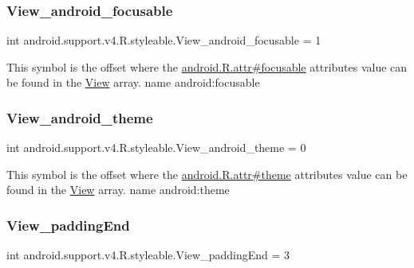 \subsubsection{\texorpdfstring{View\+\_\+android\+\_\+focusable}{View\_android\_focusable}}
{\footnotesize\ttfamily int android.\+support.\+v4.\+R.\+styleable.\+View\+\_\+android\+\_\+focusable = 1\hspace{0.3cm}{\ttfamily [static]}}

This symbol is the offset where the \hyperlink{}{android.\+R.\+attr\#focusable} attribute\textquotesingle{}s value can be found in the \hyperlink{classandroid_1_1support_1_1v4_1_1R_1_1styleable_a165672be2496e8f1adf1b075bb5fe74f}{View} array.  name android\+:focusable \mbox{\label{classandroid_1_1support_1_1v4_1_1R_1_1styleable_a96cb79802865a92d4109690435c275e2}} 
\subsubsection{\texorpdfstring{View\+\_\+android\+\_\+theme}{View\_android\_theme}}
{\footnotesize\ttfamily int android.\+support.\+v4.\+R.\+styleable.\+View\+\_\+android\+\_\+theme = 0\hspace{0.3cm}{\ttfamily [static]}}

This symbol is the offset where the \hyperlink{}{android.\+R.\+attr\#theme} attribute\textquotesingle{}s value can be found in the \hyperlink{classandroid_1_1support_1_1v4_1_1R_1_1styleable_a165672be2496e8f1adf1b075bb5fe74f}{View} array.  name android\+:theme \mbox{\label{classandroid_1_1support_1_1v4_1_1R_1_1styleable_aaf0551565567bdd67dbb44b8d96469f7}} 
\subsubsection{\texorpdfstring{View\+\_\+padding\+End}{View\_paddingEnd}}
{\footnotesize\ttfamily int android.\+support.\+v4.\+R.\+styleable.\+View\+\_\+padding\+End = 3\hspace{0.3cm}{\ttfamily [static]}}


